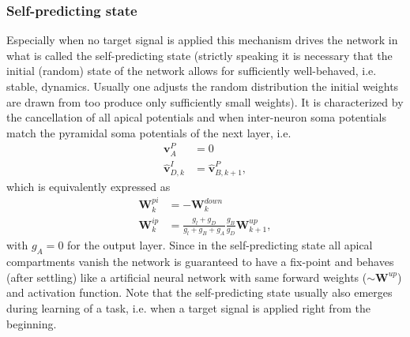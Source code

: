 \documentclass[12pt,a4paper]{article}
\begin{document}
\subsubsection{Self-predicting state}
Especially when no target signal is applied this mechanism drives the network in what is called the self-predicting state (strictly speaking it is necessary that the initial (random) state of the network allows for sufficiently well-behaved, i.e. stable, dynamics. Usually one adjusts the random distribution the initial weights are drawn from too produce only sufficiently small weights). It is characterized by the cancellation of all apical potentials and when inter-neuron soma potentials match the pyramidal soma potentials of the next layer, i.e.
\begin{align}
\bm{v}^P_A &= 0\\
\hat{\bm{v}}^I_{D,k} &= \hat{\bm{v}}^P_{B,k+1},
\end{align} 
which is equivalently expressed as 
\begin{align}
\bm{W}^{pi}_k &= - \bm{W}^{down}_k \label{eq:sps_pi} \\
\bm{W}^{ip}_k &= \frac{g_l + g_D}{g_l + g_B + g_A}\frac{g_B}{g_D}\bm{W}^{up}_{k+1}, \label{eq:sps_ip}
\end{align}
with $g_A = 0$ for the output layer. Since in the self-predicting state all apical compartments vanish the network is guaranteed to have a fix-point and behaves (after settling) like a artificial neural network with same forward weights ($\sim \bm{W}^{up}$) and activation function. Note that the self-predicting state usually also emerges during learning of a task, i.e. when a target signal is applied right from the beginning.
\end{document}
